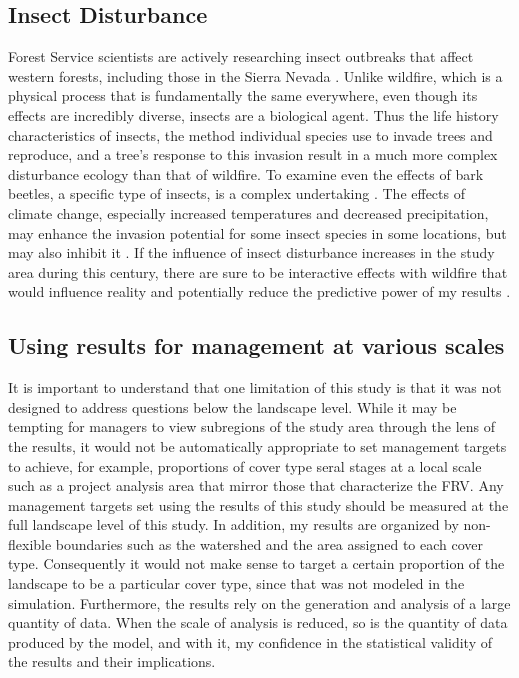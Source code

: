 \subsection{Insect Disturbance}
Forest Service scientists are actively researching insect outbreaks that affect western forests, including those in the Sierra Nevada \citep{Liebhold2011}. Unlike wildfire, which is a physical process that is fundamentally the same everywhere, even though its effects are incredibly diverse, insects are a biological agent. Thus the life history characteristics of insects, the method individual species use to invade trees and reproduce, and a tree's response to this invasion result in a much more complex disturbance ecology than that of wildfire. To examine even the effects of bark beetles, a specific type of insects, is a complex undertaking \citep{Fettig2007}. The effects of climate change, especially increased temperatures and decreased precipitation, may enhance the invasion potential for some insect species in some locations, but may also inhibit it \citep{Logan2003,Bentz2010}. If the influence of insect disturbance increases in the study area during this century, there are sure to be interactive effects with wildfire that would influence reality and potentially reduce the predictive power of my results \citep{Ferrell1996}.


\subsection{Using results for management at various scales}
It is important to understand that one limitation of this study is that it was not designed to address questions below the landscape level. While it may be tempting for managers to view subregions of the study area through the lens of the results, it would not be automatically appropriate to set management targets to achieve, for example, proportions of cover type seral stages at a local scale such as a project analysis area that mirror those that characterize the FRV. Any management targets set using the results of this study should be measured at the full landscape level of this study. In addition, my results are organized by non-flexible boundaries such as the watershed and the area assigned to each cover type. Consequently it would not make sense to target a certain proportion of the landscape to be a particular cover type, since that was not modeled in the simulation. Furthermore, the results rely on the generation and analysis of a large quantity of data. When the scale of analysis is reduced, so is the quantity of data produced by the model, and with it, my confidence in the statistical validity of the results and their implications. 

